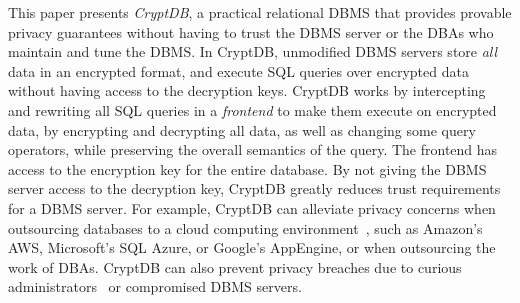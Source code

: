 This paper presents {\em CryptDB}, a practical relational DBMS that
provides provable privacy guarantees without having to trust the DBMS
server or the DBAs who maintain and tune the DBMS\@.  In CryptDB,
unmodified DBMS servers store {\em all} data in an encrypted format,
and execute SQL queries over encrypted data without having access
to the decryption keys.  CryptDB works by intercepting and rewriting
all SQL queries in a {\em frontend} to make them execute on encrypted data,
by encrypting and decrypting all data, as well as changing some query
operators, while preserving the overall semantics of the query.
The frontend has access to the encryption key for the
entire database.  By not giving the DBMS server access to the
decryption key, CryptDB greatly reduces trust requirements for a
DBMS server.  For example, CryptDB can alleviate privacy concerns when
outsourcing databases to a cloud computing
environment~\cite{xeround-blog}, such as Amazon's AWS, Microsoft's SQL
Azure, or Google's AppEngine, or when outsourcing the work of DBAs.
CryptDB can also prevent privacy breaches due to curious
administrators~\cite{chen:gmail-snooping} or compromised DBMS servers.




